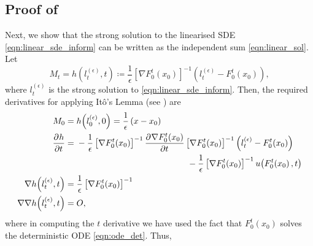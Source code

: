 \subsection{Proof of }\label{app:limit_sol_proof}

Next, we show that the strong solution to the linearised SDE \cref{eqn:linear_sde_inform} can be written as the independent sum \cref{eqn:linear_sol}.
Let
\[
	M_t = h\!\left(l_t^{(\epsilon)}, t\right) \coloneqq \frac{1}{\epsilon}\left[\nabla F_0^t\!\left(x_0\right)\right]^{-1}\left(l_t^{(\epsilon)} - F_0^t\!\left(x_0\right)\right),
\]
where \(l_t^{(\epsilon)}\) is the strong solution to \cref{eqn:linear_sde_inform}.
Then, the required derivatives for applying It\^o's Lemma (see ) are
\begin{align*}
	M_0                                              & = h\!\left(l_0^{(\epsilon)}, 0\right) = \frac{1}{\epsilon}\left(x - x_0\right)                                                                                                                                       \\
	\dpd{h}{t}                                       & = \begin{multlined}[t]
		                                                     -\frac{1}{\epsilon}\left[\nabla F_0^t\!\left(x_0\right)\right]^{-1} \dpd{\nabla F_0^t\!\left(x_0\right)}{t}\left[\nabla F_0^t\!\left(x_0\right)\right]^{-1}\left(l_t^{(\epsilon)} - F_0^t\!\left(x_0\right)\right) \\
		                                                     - \frac{1}{\epsilon}\left[\nabla F_0^t\!\left(x_0\right)\right]^{-1}u\!\left(F_0^t\!\left(x_0\right), t\right)
	                                                     \end{multlined} \\
	\nabla h\!\left(l_t^{(\epsilon)}, t\right)       & = \frac{1}{\epsilon}\left[\nabla F_0^t\!\left(x_0\right)\right]^{-1}                                                                                                                                                 \\
	\nabla\nabla h\!\left(l_t^{(\epsilon)}, t\right) & = O,
\end{align*}
where in computing the \(t\) derivative we have used the fact that \(F_0^t\!\left(x_0\right)\) solves the deterministic ODE \cref{eqn:ode_det}.
Thus,
